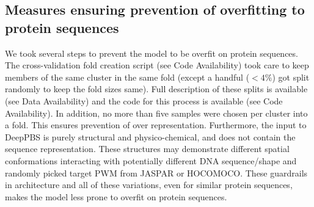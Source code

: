 \subsection{Measures ensuring prevention of overfitting to protein sequences}
We took several steps to prevent the model to be overfit on protein sequences. The cross-validation fold creation script (see Code Availability) took care to keep members of the same cluster in the same fold (except a handful ($<4\%$) got split randomly to keep the fold sizes same). Full description of these splits is available (see Data Availability) and the code for this process is available (see Code Availability). In addition, no more than five samples were chosen per cluster into a fold. This ensures prevention of over representation. Furthermore, the input to DeepPBS is purely structural and physico-chemical, and does not contain the sequence representation. These structures may demonstrate different spatial conformations interacting with potentially different DNA sequence/shape and randomly picked target PWM from JASPAR or HOCOMOCO. These guardrails in architecture and all of these variations, even for similar protein sequences, makes the model less prone to overfit on protein sequences. 
\\
